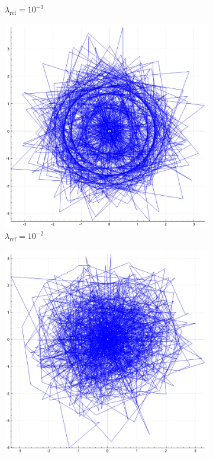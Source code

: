 \documentclass[report.tex]{subfiles}
\begin{document}
\begin{figure}
\begin{subfigure}{.25\textwidth}
    \caption*{$\lambda_{\text{ref}} = 10^{-3}$}
  \end{subfigure}
  \begin{subfigure}{.25\textwidth}
    \includegraphics[width=\textwidth]{img/bps_ref_0_01}
    \caption*{$\lambda_{\text{ref}} = 10^{-2}$}
  \end{subfigure}
  \begin{subfigure}{.25\textwidth}
    \includegraphics[width=\textwidth]{img/bps_ref_0_1}

\end{subfigure}
\end{figure}
\end{document}
